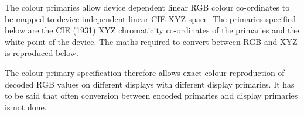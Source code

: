 The colour primaries allow device dependent linear RGB colour
co-ordinates to be mapped to device independent linear CIE XYZ space.
The primaries specified below are the CIE (1931) XYZ chromaticity
co-ordinates of the primaries and the white point of the device. The
maths required to convert between RGB and XYZ is reproduced below.



The colour primary specification therefore allows exact colour
reproduction of decoded RGB values on different displays with different
display primaries. It has to be said that often conversion between
encoded primaries and display primaries is not done.

